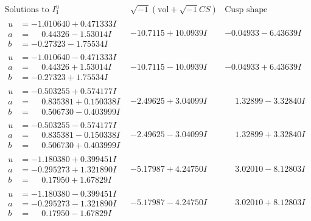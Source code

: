 \documentclass[1p]{elsarticle_modified}
\theoremstyle{definition}
\newcommand{\I}{\sqrt{-1}}
\begin{document}
$$\begin{array}{c|c|c}  
\text{Solutions to }I^u_{1}& \I (\text{vol} + \sqrt{-1}CS) & \text{Cusp shape}\\
 \hline 
\begin{aligned}
u &= -1.010640 + 0.471333 I \\
a &= \phantom{-}0.44326 - 1.53014 I \\
b &= -0.27323 - 1.75534 I\end{aligned}
 & -10.7115 + 10.0939 I & -0.04933 - 6.43639 I \\ \hline\begin{aligned}
u &= -1.010640 - 0.471333 I \\
a &= \phantom{-}0.44326 + 1.53014 I \\
b &= -0.27323 + 1.75534 I\end{aligned}
 & -10.7115 - 10.0939 I & -0.04933 + 6.43639 I \\ \hline\begin{aligned}
u &= -0.503255 + 0.574177 I \\
a &= \phantom{-}0.835381 + 0.150338 I \\
b &= \phantom{-}0.506730 - 0.403999 I\end{aligned}
 & -2.49625 + 3.04099 I & \phantom{-}1.32899 - 3.32840 I \\ \hline\begin{aligned}
u &= -0.503255 - 0.574177 I \\
a &= \phantom{-}0.835381 - 0.150338 I \\
b &= \phantom{-}0.506730 + 0.403999 I\end{aligned}
 & -2.49625 - 3.04099 I & \phantom{-}1.32899 + 3.32840 I \\ \hline\begin{aligned}
u &= -1.180380 + 0.399451 I \\
a &= -0.295273 + 1.321890 I \\
b &= \phantom{-}0.17950 + 1.67829 I\end{aligned}
 & -5.17987 + 4.24750 I & \phantom{-}3.02010 - 8.12803 I \\ \hline\begin{aligned}
u &= -1.180380 - 0.399451 I \\
a &= -0.295273 - 1.321890 I \\
b &= \phantom{-}0.17950 - 1.67829 I\end{aligned}
 & -5.17987 - 4.24750 I & \phantom{-}3.02010 + 8.12803 I \\ \hline\begin{aligned}

\end{aligned}
\end{array}$$
\end{document}
